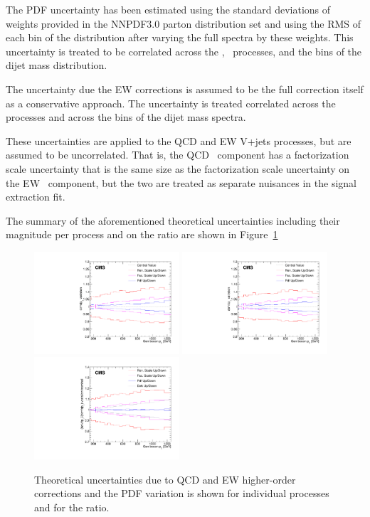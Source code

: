 The PDF uncertainty has been estimated using the standard deviations of
weights provided in the NNPDF3.0 parton distribution set and
using the RMS of each bin of the distribution after varying the full
spectra by these weights. This uncertainty is treated to be correlated across the
\Zjets, \Wjets~processes, and the bins of the dijet mass distribution.

The uncertainty due the EW corrections is assumed to be the full correction itself as
a conservative approach. The uncertainty is treated correlated across the processes and
across the bins of the dijet mass spectra.

These uncertainties are applied to the QCD and EW V+jets processes, but are assumed to be uncorrelated. That is, the QCD \Wjets~component has a factorization scale uncertainty that is the same size as the factorization scale uncertainty on the EW \Wjets~component, but the two are treated as separate nuisances in the signal extraction fit.

The summary of the aforementioned theoretical uncertainties including their magnitude per process
and on the ratio are shown in Figure~\ref{fig:theory_unc}

\begin{figure}[htb!]
  \begin{center}
    \includegraphics[width=0.48\textwidth]{fig/theory/zratio_unc.pdf}
    \includegraphics[width=0.48\textwidth]{fig/theory/wratio_unc.pdf}\\
    \includegraphics[width=0.48\textwidth]{fig/theory/bosonpt_ratio_uncertainty.pdf}
    \caption{Theoretical uncertainties due to QCD and EW higher-order corrections and the PDF variation is shown for individual processes and for the ratio.}
    \label{fig:theory_unc}
  \end{center}
\end{figure}


